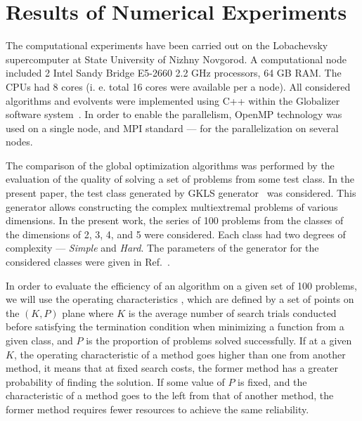 \documentclass[runningheads]{llncs}
\begin{document}
\section{Results of Numerical Experiments}

The computational experiments have been carried out on the Lobachevsky supercomputer at
State University of Nizhny Novgorod. A computational node included 2 Intel
Sandy Bridge E5-2660 2.2 GHz processors, 64 GB RAM. The CPUs had 8 cores (i. e. total 16
cores were available per a node). All considered algorithms and evolvents were implemented
using C++ within the Globalizer software system~\cite{globalizerSystem}.
In order to enable the parallelism,
OpenMP technology was used on a single node, and MPI standard --- for the parallelization on
several nodes.

The comparison of the global optimization algorithms was performed by the evaluation of the
quality of solving a set of problems from some test class.
In the present paper, the test class generated by GKLS generator~\cite{Gaviano2003} was
considered. This generator allows constructing the complex multiextremal problems of various
dimensions. In the present work, the series of 100 problems from the classes of the dimensions
of 2, 3, 4, and 5 were considered.
Each class had two degrees of complexity --- \textit{Simple} and \textit{Hard}. The parameters
of the generator for the considered classes were given in Ref.~\cite{Gaviano2003}.


In order to evaluate the efficiency of an algorithm on a given set of 100 problems, we will use
the
operating characteristics \cite{grishaginClass}, which are defined by a set of
points on the \((K, P)\) plane where \(K\) is the average number of search trials
conducted before satisfying the termination condition when minimizing a function
from a given class, and \(P\) is the proportion of problems solved successfully.
If at a given \(K\), the operating characteristic of a method goes higher than one
from another method, it means that at fixed search costs, the former method has a
greater probability of finding the solution. If some value of \(P\) is fixed, and the
characteristic of a method goes to the left from that of another method, the former
method requires fewer resources to achieve the same reliability.

\end{document}
